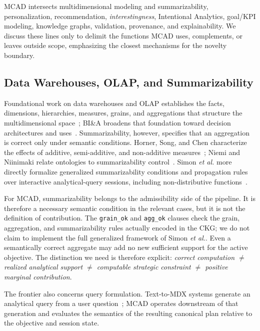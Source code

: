 \documentclass[journal]{IEEEtran}
\begin{document}
MCAD intersects multidimensional modeling and summarizability, personalization, recommendation, \emph{interestingness}, Intentional Analytics, goal/KPI modeling, knowledge graphs, validation, provenance, and explainability. We discuss these lines only to delimit the functions MCAD uses, complements, or leaves outside scope, emphasizing the closest mechanisms for the novelty boundary.

\subsection{Data Warehouses, OLAP, and Summarizability}

Foundational work on data warehouses and OLAP establishes the facts, dimensions, hierarchies, measures, grains, and aggregations that structure the multidimensional space~\cite{ChaudhuriDayal97,KimballRoss2013}; BI\&A broadens that foundation toward decision architectures and uses~\cite{ChenBI2012}. Summarizability, however, specifies that an aggregation is correct only under semantic conditions. Horner, Song, and Chen characterize the effects of additive, semi-additive, and non-additive measures~\cite{HornerSongChen2004}; Niemi and Niinimaki relate ontologies to summarizability control~\cite{NiemiNiinimaki2010}. Simon \emph{et al.} more directly formalize generalized summarizability conditions and propagation rules over interactive analytical-query sessions, including non-distributive functions~\cite{SimonAmannLiuGancarski2023}.

For MCAD, summarizability belongs to the admissibility side of the pipeline. It is therefore a necessary semantic condition in the relevant cases, but it is not the definition of contribution. The \texttt{grain\_ok} and \texttt{agg\_ok} clauses check the grain, aggregation, and summarizability rules actually encoded in the CKG; we do not claim to implement the full generalized framework of Simon \emph{et al.}. Even a semantically correct aggregate may add no new sufficient support for the active objective. The distinction we need is therefore explicit: \emph{correct computation $\neq$ realized analytical support $\neq$ computable strategic constraint $\neq$ positive marginal contribution}.

The frontier also concerns query formulation. Text-to-MDX systems generate an analytical query from a user question~\cite{BimonteRizziTextToMDX2026}; MCAD operates downstream of that generation and evaluates the semantics of the resulting canonical plan relative to the objective and session state.
\end{document}
